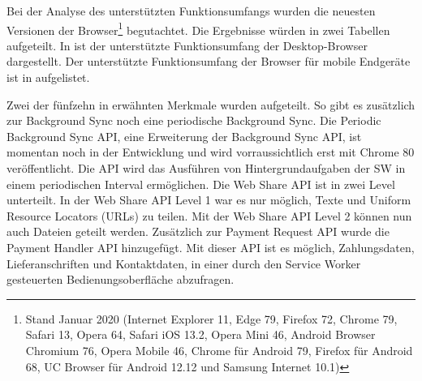 Bei der Analyse des unterstützten Funktionsumfangs wurden die neuesten Versionen der Browser\footnote{Stand Januar 2020 (Internet Explorer 11, Edge 79, Firefox 72, Chrome 79, Safari 13, Opera 64, Safari iOS 13.2, Opera Mini 46, Android Browser Chromium 76, Opera Mobile 46, Chrome für Android 79, Firefox für Android 68, UC Browser für Android 12.12 und Samsung Internet 10.1) }
begutachtet. Die Ergebnisse würden in zwei Tabellen aufgeteilt. In 
ist der unterstützte Funktionsumfang der Desktop-Browser dargestellt. Der unterstützte Funktionsumfang der Browser
für mobile Endgeräte ist in  aufgelistet.

Zwei der fünfzehn in  erwähnten Merkmale wurden aufgeteilt.
So gibt es zusätzlich zur Background Sync noch eine
periodische Background Sync. Die Periodic Background Sync API, eine Erweiterung der Background
Sync API, ist momentan noch in der Entwicklung und wird vorraussichtlich erst mit
Chrome 80 veröffentlicht. Die API wird das Ausführen von Hintergrundaufgaben der SW
in einem periodischen Interval ermöglichen.\cite{ChromeStatusPeriodicBackgroundSync}
Die Web Share API ist in zwei Level unterteilt. In der Web Share API Level 1 war es
nur möglich, Texte und Uniform Resource Locators (URLs) zu teilen. Mit der Web Share
API Level 2 können nun auch Dateien geteilt werden.\cite{WebShareAPITwoChromeStatus}
Zusätzlich zur Payment Request API wurde die Payment Handler API hinzugefügt. Mit dieser
API ist es möglich, Zahlungsdaten, Lieferanschriften und Kontaktdaten, in einer durch
den Service Worker gesteuerten Bedienungsoberfläche abzufragen.\cite{PaymentHandlerAPIGoogleDev}

